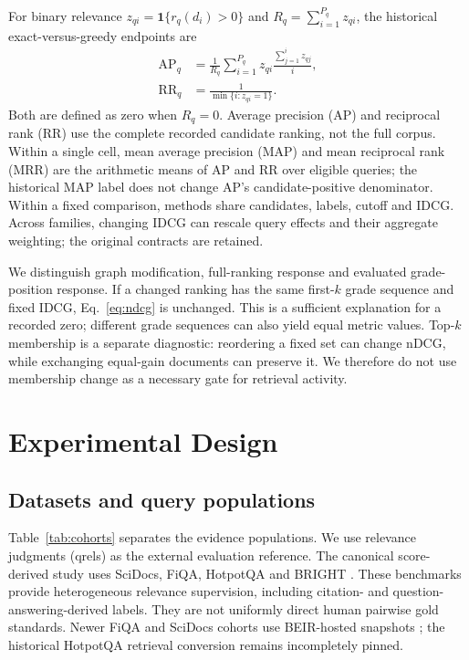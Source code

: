 \documentclass[pdflatex,iicol,sn-basic,Numbered]{sn-jnl}
\begin{document}
For binary relevance $z_{qi}=\mathbf1\{r_q(d_i)>0\}$ and $R_q=\sum_{i=1}^{P_q}z_{qi}$, the historical exact-versus-greedy endpoints are
\begin{equation}
\begin{aligned}\operatorname{AP}_q&=\frac{1}{R_q}\sum_{i=1}^{P_q} z_{qi}\frac{\sum_{j=1}^{i}z_{qj}}{i},\\
\operatorname{RR}_q&=\frac{1}{\min\{i:z_{qi}=1\}}.\end{aligned}
\label{eq:ap-rr}
\end{equation}
Both are defined as zero when $R_q=0$. Average precision (AP) and reciprocal rank (RR) use the complete recorded candidate ranking, not the full corpus. Within a single cell, mean average precision (MAP) and mean reciprocal rank (MRR) are the arithmetic means of AP and RR over eligible queries; the historical MAP label does not change AP's candidate-positive denominator. Within a fixed comparison, methods share candidates, labels, cutoff and IDCG. Across families, changing IDCG can rescale query effects and their aggregate weighting; the original contracts are retained.

We distinguish graph modification, full-ranking response and evaluated grade-position response. If a changed ranking has the same first-$k$ grade sequence and fixed IDCG, Eq.~\eqref{eq:ndcg} is unchanged. This is a sufficient explanation for a recorded zero; different grade sequences can also yield equal metric values. Top-$k$ membership is a separate diagnostic: reordering a fixed set can change nDCG, while exchanging equal-gain documents can preserve it. We therefore do not use membership change as a necessary gate for retrieval activity.

\section{Experimental Design}\label{sec:design}
\subsection{Datasets and query populations}
Table~\ref{tab:cohorts} separates the evidence populations. We use relevance judgments (qrels) as the external evaluation reference. The canonical score-derived study uses SciDocs, FiQA, HotpotQA and BRIGHT \cite{cohan2020scidocs,maia2018fiqa,yang2018hotpotqa,su2025bright}. These benchmarks provide heterogeneous relevance supervision, including citation- and question-answering-derived labels. They are not uniformly direct human pairwise gold standards. Newer FiQA and SciDocs cohorts use BEIR-hosted snapshots \cite{thakur2021beir}; the historical HotpotQA retrieval conversion remains incompletely pinned.
\end{document}
